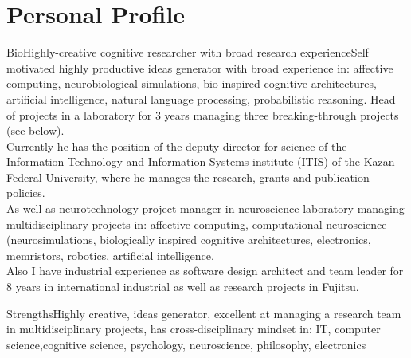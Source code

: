 \documentclass{moderncv}
\begin{document}
%
\makecvtitle

 
\section{Personal Profile}

\cventry
    {Bio}{Highly-creative cognitive researcher with broad research experience}{}{}{}{Self motivated highly productive ideas generator with broad experience in: affective computing, neurobiological simulations, bio-inspired cognitive architectures, artificial intelligence, natural language processing, probabilistic reasoning. Head of projects in a laboratory for 3 years managing three breaking-through projects (see below).\\
      Currently he has the position of the deputy director for science of the Information Technology and Information Systems institute (ITIS) of the Kazan Federal University, where he manages the research, grants and publication policies.\\
      As well as neurotechnology project manager in neuroscience laboratory managing multidisciplinary projects in: affective computing, computational neuroscience (neurosimulations, biologically inspired cognitive architectures, electronics, memristors, robotics, artificial intelligence.\\
      Also I have industrial experience as software design architect and team leader for 8 years in international industrial as well as research projects in Fujitsu.}

\cvitem
{Strengths}{Highly creative, ideas generator, excellent at managing a research team in multidisciplinary projects, has cross-disciplinary mindset in: IT, computer science,cognitive science, psychology, neuroscience, philosophy, electronics}
\end{document}
